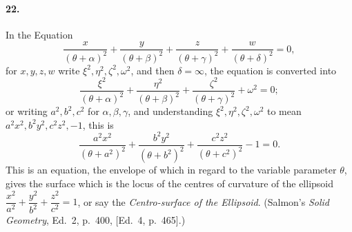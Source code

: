 \documentclass[11pt,a4paper]{article}
\begin{document}
\paragraph{22.}
In the Equation
\[
\frac{x}{(\theta + \alpha)^2} + \frac{y}{(\theta + \beta)^2}
+ \frac{z}{(\theta + \gamma)^2} + \frac{w}{(\theta + \delta)^2} = 0,
\]
for $x, y, z, w$ write $\xi^2, \eta^2, \zeta^2, \omega^2$, and then
$\delta = \infty$, the equation is converted into
\[
\frac{\xi^2}{(\theta + \alpha)^2} + \frac{\eta^2}{(\theta + \beta)^2}
+ \frac{\zeta^2}{(\theta + \gamma)^2} + \omega^2 = 0;
\]
or writing $a^2, b^2, c^2$ for $\alpha, \beta, \gamma$, and understanding $\xi^2, \eta^2, \zeta^2, \omega^2$
to mean $a^2 x^2, b^2 y^2, c^2 z^2, -1$, this is
\[
\frac{a^2 x^2}{(\theta + a^2)^2} + \frac{b^2 y^2}{(\theta + b^2)^2}
+ \frac{c^2 z^2}{(\theta + c^2)^2} - 1 = 0.
\]
This is an equation, the envelope of which in regard to the variable parameter $\theta$,
gives the surface which is the locus of the centres of curvature of the ellipsoid
$\dfrac{x^2}{a^2} + \dfrac{y^2}{b^2} + \dfrac{z^2}{c^2} = 1$, or say the
\textit{Centro-surface of the Ellipsoid}. (Salmon's \textit{Solid Geometry}, Ed.\ 2,
p.\ 400, [Ed.\ 4, p.\ 465].)
\end{document}
